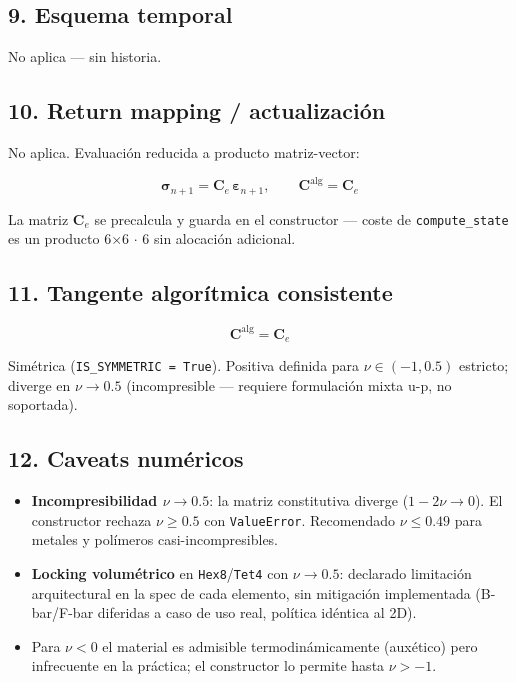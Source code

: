 \documentclass[11pt,letterpaper,oneside]{report}
\begin{document}
\subsection{9. Esquema temporal}

No aplica --- sin historia.

\subsection{10. Return mapping / actualización}

No aplica. Evaluación reducida a producto matriz-vector:

\[
\boldsymbol\sigma_{n+1} = \mathbf C_e\,\boldsymbol\varepsilon_{n+1}, \qquad \mathbf C^{\text{alg}} = \mathbf C_e
\]

La matriz $\mathbf C_e$ se precalcula y guarda en el constructor --- coste de \texttt{compute\_state} es un producto 6\ensuremath{\times}6 \ensuremath{\cdot} 6 sin alocación adicional.

\subsection{11. Tangente algorítmica consistente}

\[
\mathbf C^{\text{alg}} = \mathbf C_e
\]

Simétrica (\texttt{IS\_SYMMETRIC = True}). Positiva definida para $\nu \in (-1, 0.5)$ estricto; diverge en $\nu \to 0.5$ (incompresible --- requiere formulación mixta u-p, no soportada).

\subsection{12. Caveats numéricos}

\begin{itemize}
  \item \textbf{Incompresibilidad $\nu \to 0.5$}: la matriz constitutiva diverge ($1-2\nu \to 0$). El constructor rechaza $\nu \ge 0.5$ con \texttt{ValueError}. Recomendado $\nu \le 0.49$ para metales y polímeros casi-incompresibles.
  \item \textbf{Locking volumétrico} en \texttt{Hex8}/\texttt{Tet4} con $\nu \to 0.5$: declarado limitación arquitectural en la spec de cada elemento, sin mitigación implementada (B-bar/F-bar diferidas a caso de uso real, política idéntica al 2D).
  \item Para $\nu < 0$ el material es admisible termodinámicamente (auxético) pero infrecuente en la práctica; el constructor lo permite hasta $\nu > -1$.
\end{itemize}
\end{document}
